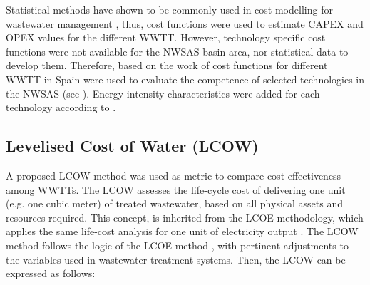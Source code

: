 
Statistical methods have shown to be commonly used in cost-modelling for wastewater management \cite{Costmodellingwastewater2011,Assessmentwastewatertreatment2012,Economicfeasibility2012}, thus, cost functions were used to estimate CAPEX and OPEX values for the different WWTT. However, technology specific cost functions were not available for the NWSAS basin area, nor statistical data to develop them. Therefore, based on the work of \citet{Assessmentwastewatertreatment2012} cost functions for different WWTT in Spain were used to evaluate the competence of selected technologies in the NWSAS (see ). Energy intensity characteristics were added for each technology according to \cite{Energypatternanalysis2012,ComparativeAnalysisEnergy2017}.

% 

\subsection{Levelised Cost of Water (LCOW)}
A proposed LCOW method was used as metric to compare cost-effectiveness among WWTTs. The LCOW assesses the life-cycle cost of delivering one unit (e.g. one cubic meter) of treated wastewater, based on all physical assets and resources required. This concept, is inherited from the LCOE methodology, which applies the same life-cost analysis for one unit of electricity output \cite{prospectscostcompetitive2013}. The LCOW method follows the logic of the LCOE method \cite{prospectscostcompetitive2013,GeospatialLevelizedCost2015}, with pertinent adjustments to the variables used in wastewater treatment systems. Then, the LCOW can be expressed as follows:

